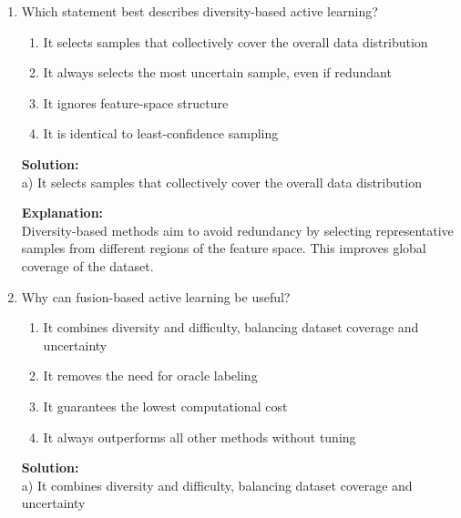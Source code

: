 \documentclass{article}
\begin{document}
\begin{enumerate}
\textbf{Solution:} \\
b) Select samples with the smallest difference between the top two predicted class probabilities

\textbf{Explanation:} \\
Margin sampling focuses on samples for which the model is nearly undecided between two classes. These are often near the decision boundary and are especially useful for refining the classifier.

\vspace{1em}

\item Which statement best describes diversity-based active learning?

\begin{enumerate}
    \item It selects samples that collectively cover the overall data distribution
    \item It always selects the most uncertain sample, even if redundant
    \item It ignores feature-space structure
    \item It is identical to least-confidence sampling
\end{enumerate}

\textbf{Solution:} \\
a) It selects samples that collectively cover the overall data distribution

\textbf{Explanation:} \\
Diversity-based methods aim to avoid redundancy by selecting representative samples from different regions of the feature space. This improves global coverage of the dataset.

\vspace{1em}

\item Why can fusion-based active learning be useful?

\begin{enumerate}
    \item It combines diversity and difficulty, balancing dataset coverage and uncertainty
    \item It removes the need for oracle labeling
    \item It guarantees the lowest computational cost
    \item It always outperforms all other methods without tuning
\end{enumerate}

\textbf{Solution:} \\
a) It combines diversity and difficulty, balancing dataset coverage and uncertainty


\end{enumerate}
\end{document}
